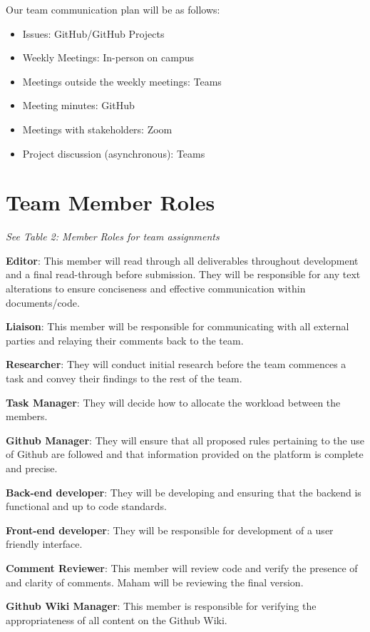 \documentclass{article}
\begin{document}
Our team communication plan will be as follows:
\begin{itemize}
  \item Issues: GitHub/GitHub Projects
  \item Weekly Meetings: In-person on campus
  \item Meetings outside the weekly meetings: Teams
  \item Meeting minutes: GitHub
  \item Meetings with stakeholders: Zoom
  \item Project discussion (asynchronous): Teams
\end{itemize}


\section{Team Member Roles}

\textit{See Table 2: Member Roles for team assignments} \\
\begin{flushleft}
  \textbf{Editor}: This member will read through all deliverables throughout development and a final read-through before submission. They will be responsible for any
  text alterations to ensure conciseness and effective communication within documents/code.
 
  \textbf{Liaison}: This member will be responsible for communicating with all external parties and relaying their comments back to the team.

  \textbf{Researcher}: They will conduct initial research before the team commences a task and convey their findings to the rest of the team.

  \textbf{Task Manager}: They will decide how to allocate the workload between the members.

  \textbf{Github Manager}: They will ensure that all proposed rules pertaining to the use of Github are followed and that information provided on the platform is complete and precise.

  \textbf{Back-end developer}: They will be developing and ensuring that the backend is functional and up to code standards.

  \textbf{Front-end developer}: They will be responsible for development of a user friendly interface.

  \textbf{Comment Reviewer}: This member will review code and verify the presence of and clarity of comments. Maham will be reviewing the final version.

  \textbf{Github Wiki Manager}: This member is responsible for verifying the appropriateness of all content on the Github Wiki.
\end{flushleft}
\end{document}
